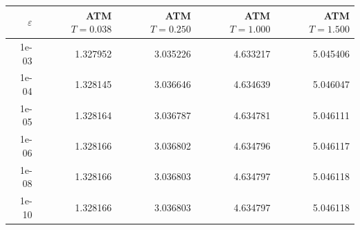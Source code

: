 \begin{tabular}{rrrrr}
\toprule
$\varepsilon$ & ATM $T=0.038$ & ATM $T=0.250$ & ATM $T=1.000$ & ATM $T=1.500$\\
\midrule
1e-03 & 1.327952 & 3.035226 & 4.633217 & 5.045406\\
1e-04 & 1.328145 & 3.036646 & 4.634639 & 5.046047\\
1e-05 & 1.328164 & 3.036787 & 4.634781 & 5.046111\\
1e-06 & 1.328166 & 3.036802 & 4.634796 & 5.046117\\
1e-08 & 1.328166 & 3.036803 & 4.634797 & 5.046118\\
1e-10 & 1.328166 & 3.036803 & 4.634797 & 5.046118\\
\bottomrule
\end{tabular}
